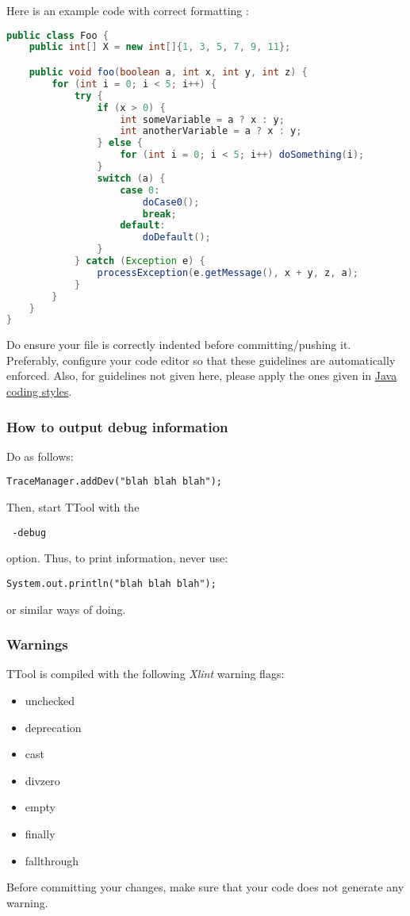 \documentclass[12pt]{article}
\begin{document}
Here is an example code with correct formatting : \\

\begin{lstlisting}[showspaces=true, language=java, commentstyle=\color{pgreen},
keywordstyle=\color{pblue}, stringstyle=\color{pred}, basicstyle=\ttfamily]
public class Foo {
    public int[] X = new int[]{1, 3, 5, 7, 9, 11};

    public void foo(boolean a, int x, int y, int z) {
        for (int i = 0; i < 5; i++) {
            try {
                if (x > 0) {
                    int someVariable = a ? x : y;
                    int anotherVariable = a ? x : y;
                } else {
                    for (int i = 0; i < 5; i++) doSomething(i);
                }
                switch (a) {
                    case 0:
                        doCase0();
                        break;
                    default:
                        doDefault();
                }
            } catch (Exception e) {
                processException(e.getMessage(), x + y, z, a);
            }
        }
    }
}
\end{lstlisting}

Do ensure your file is correctly indented before committing/pushing it.
Preferably, configure your code editor so that these guidelines are
automatically enforced. Also, for guidelines not given here, please apply the ones given in \href{https://google.github.io/styleguide/javaguide.html}{Java coding styles}.


\subsubsection{How to output debug information}
\label{sec:debug_info}
Do as follows:
\begin{lstlisting}
TraceManager.addDev("blah blah blah");
\end{lstlisting}
Then, start TTool with the 
\begin{verbatim}
 -debug
\end{verbatim}
option.
Thus, to print information, never use:
\begin{lstlisting}
System.out.println("blah blah blah");
\end{lstlisting}
or similar ways of doing.

\subsubsection{Warnings}
TTool is compiled with the following \textit{Xlint} warning flags:
\begin{itemize}
    \item unchecked
    \item deprecation
    \item cast
    \item divzero
    \item empty
    \item finally
    \item fallthrough
\end{itemize}
Before committing your changes, make sure that your code does not generate any
warning.
\end{document}

